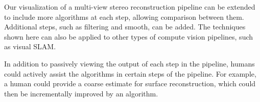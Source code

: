 \documentclass[10pt,twocolumn,letterpaper]{article}
\begin{document}
Our visualization of a multi-view stereo reconstruction pipeline can be extended to include more algorithms at each step, allowing comparison between them. Additional steps, such as filtering and smooth, can be added. The techniques shown here can also be applied to other types of compute vision pipelines, such as visual SLAM.\cite{slam}

In addition to passively viewing the output of each step in the pipeline, humans could actively assist the algorithms in certain steps of the pipeline. For example, a human could provide a coarse estimate for surface reconstruction, which could then be incrementally improved by an algorithm.


\nocite{*}

{\small
  
  
}
\end{document}
